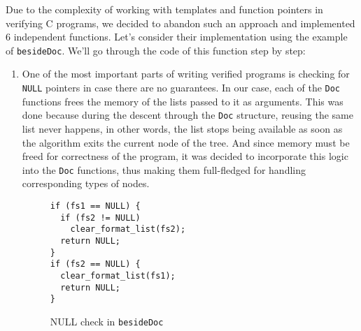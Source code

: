 \documentclass[14pt]{constructor-diploma}
\begin{document}
Due to the complexity of working with templates and function pointers in verifying C programs, we decided to abandon such an approach and implemented 6 independent functions. 
Let's consider their implementation using the example of \texttt{besideDoc}. We'll go through the code of this function step by step:
\begin{enumerate}
  \item One of the most important parts of writing verified programs is checking for \texttt{NULL} pointers in case there are no guarantees. 
  In our case, each of the \texttt{Doc} functions frees the memory of the lists passed to it as arguments. 
  This was done because during the descent through the \texttt{Doc} structure, reusing the same list never happens, in other words, the list stops being available as soon as the algorithm exits the current node of the tree. 
  And since memory must be freed for correctness of the program, it was decided to incorporate this logic into the \texttt{Doc} functions, thus making them full-fledged for handling corresponding types of nodes.
\begin{figure}[H]
\begin{mdframed}[backgroundcolor=bg]
\begin{verbatim}
if (fs1 == NULL) {
  if (fs2 != NULL)
    clear_format_list(fs2);
  return NULL;
}
if (fs2 == NULL) {
  clear_format_list(fs1);
  return NULL;
}
\end{verbatim}
\end{mdframed}
\caption{NULL check in \texttt{besideDoc}}
\label{fig:beside_doc_null_check}
\end{figure}


\end{enumerate}
\end{document}
